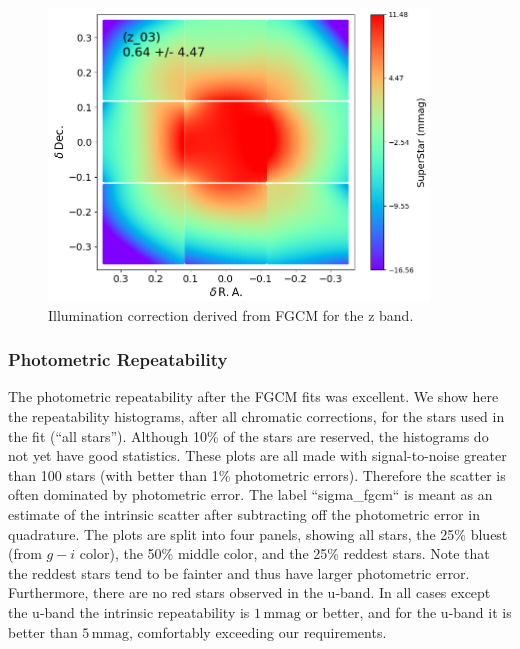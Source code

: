 \begin{figure}
  \begin{center}
    \includegraphics[width=0.9\textwidth]{photometric_calibration_figures/illumcorr_z.png}
  \end{center}
  \caption{Illumination correction derived from FGCM for the z band.}
\end{figure}

\subsubsection{Photometric Repeatability}

The photometric repeatability after the FGCM fits was excellent. We show here
the repeatability histograms, after all chromatic corrections, for the stars
used in the fit (``all stars'').  Although 10\% of the stars are reserved,
the histograms do not yet have good statistics.  These plots are all made with
signal-to-noise greater than 100 stars (with better than 1\% photometric
errors).  Therefore the scatter is often dominated by photometric error.  The
label ``sigma\_fgcm`` is meant as an estimate of the intrinsic scatter after
subtracting off the photometric error in quadrature. The plots are split into
four panels, showing all stars, the 25\% bluest (from $g-i$ color), the 50\%
middle color, and the 25\% reddest stars. Note that the reddest stars tend to
be fainter and thus have larger photometric error. Furthermore, there are no
red stars observed in the u-band. In all cases except the u-band the intrinsic
repeatability is $1\,\mathrm{mmag}$ or better, and for the u-band it is better
than $5\,\mathrm{mmag}$, comfortably exceeding our requirements.

